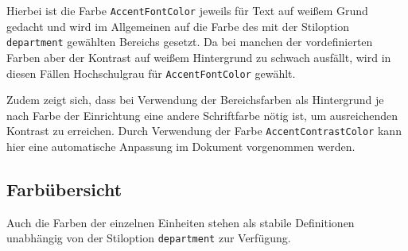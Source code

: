 Hierbei ist die Farbe \verb+AccentFontColor+ jeweils für Text auf weißem Grund gedacht und wird im Allgemeinen auf die Farbe des mit der Stiloption  \verb+department+ gewählten Bereichs gesetzt.
Da bei manchen der vordefinierten Farben aber der Kontrast auf weißem Hintergrund zu schwach ausfällt, wird in diesen Fällen Hochschulgrau für \verb+AccentFontColor+ gewählt.

Zudem zeigt sich, dass bei Verwendung der Bereichsfarben als Hintergrund je nach Farbe der Einrichtung eine andere Schriftfarbe nötig ist, um ausreichenden Kontrast zu erreichen.
Durch Verwendung der Farbe \verb+AccentContrastColor+ kann hier eine automatische Anpassung im Dokument vorgenommen werden.

\subsection{Farbübersicht}

Auch die Farben der einzelnen Einheiten stehen als stabile Definitionen unabhängig von der Stiloption \verb+department+ zur Verfügung.

